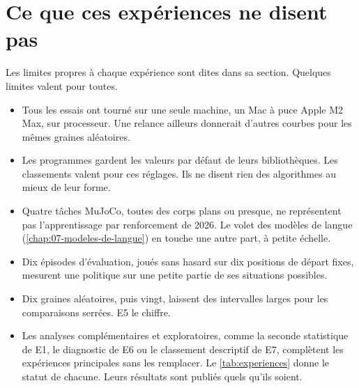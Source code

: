 \section{Ce que ces expériences ne disent pas}\label{sec:limites-experiences}

Les limites propres à chaque expérience sont dites dans sa section. Quelques limites valent pour toutes.
\begin{itemize}
  \item Tous les essais ont tourné sur une seule machine, un Mac à puce Apple M2 Max, sur processeur. Une
    relance ailleurs donnerait d'autres courbes pour les mêmes graines aléatoires.
  \item Les programmes gardent les valeurs par défaut de leurs bibliothèques. Les classements valent pour ces
    réglages. Ils ne disent rien des algorithmes au mieux de leur forme.
  \item Quatre tâches MuJoCo, toutes des corps plans ou presque, ne représentent pas l'apprentissage par
    renforcement de 2026. Le volet des modèles de langue (\cref{chap:07-modeles-de-langue}) en touche une autre
    part, à petite échelle.
  \item Dix épisodes d'évaluation, joués sans hasard sur dix positions de départ fixes, mesurent une politique
    sur une petite partie de ses situations possibles.
  \item Dix graines aléatoires, puis vingt, laissent des intervalles larges pour les comparaisons serrées. E5
    le chiffre.
  \item Les analyses complémentaires et exploratoires, comme la seconde statistique de E1, le diagnostic
    de E6 ou le classement descriptif de E7, complètent les expériences principales sans les remplacer. Le
    \cref{tab:experiences} donne le statut de chacune. Leurs résultats sont publiés quels qu'ils soient.
  
\end{itemize}
